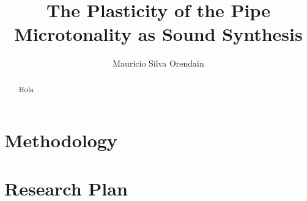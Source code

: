 \documentclass[11pt, oneside]{report}   	%
\title{The Plasticity of the Pipe \\
  \large Microtonality as Sound Synthesis \\
    }
\author{Mauricio Silva Orendain}
\begin{document}
\maketitle

\tableofcontents

\begin{abstract}
Hola
\end{abstract}

\chapter{Methodology}


\chapter{Research Plan}

\end{document}

